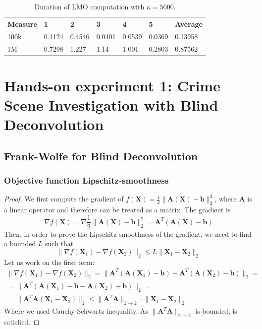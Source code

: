 \documentclass[12pt]{article}
\newcommand{\boldX}{\mathbf{X}}
\newcommand{\boldb}{\mathbf{b}}
\newcommand{\boldA}{\mathbf{A}}
\begin{document}
\begin{table}[ht]
\centering
\caption{Duration of LMO computation with $\kappa = 5000.$}
\label{tab:lmo-durations}
\begin{tabular}{lllllll}
Measure & 1 & 2 & 3 & 4 & 5 & Average \\ \hline
100k & 0.1124 & 0.4546 & 0.0401 & 0.0539 & 0.0369 & 0.13958 \\ \hline
1M & 0.7298 & 1.227 & 1.14 & 1.001 & 0.2803 & 0.87562
\end{tabular}
\end{table}

\section{Hands-on experiment 1: Crime Scene Investigation with Blind Deconvolution}

\subsection{Frank-Wolfe for Blind Deconvolution}
\subsubsection{Objective function Lipschitz-smoothness}
\begin{proof}
We first compute the gradient of $f(\boldX) = \frac{1}{2} \lVert \boldA(\boldX) - \boldb \rVert_{2}^{2}$, where $\boldA$ is a linear operator and therefore can be treated as a matrix. The gradient is
\begin{equation}
    \nabla f(\boldX) = \nabla \frac{1}{2} \lVert \boldA(\boldX) - \boldb \rVert_{2}^{2} = \boldA^T(\boldA(\boldX) - \boldb)
\end{equation}
Then, in order to prove the Lipschitz smoothness of the gradient, we need to find a bounded $L$ such that
\begin{equation} \label{eq:lipschitz}
    \lVert \nabla f(\boldX_1) - \nabla f(\boldX_2) \rVert_{2} \leq L \lVert \boldX_1 - \boldX_2 \rVert_{2}
\end{equation}
Let us work on the first term:
\begin{gather}
    \lVert \nabla f(\boldX_1) - \nabla f(\boldX_2) \rVert_{2} = \lVert \boldA^T(\boldA(\boldX_1) - \boldb) - \boldA^T(\boldA(\boldX_2) - \boldb) \rVert_{2} = \\
    = \lVert \boldA^T(\boldA(\boldX_1) - \boldb - \boldA(\boldX_2) + \boldb) \rVert_{2} = \\
    = \lVert \boldA^T\boldA(\boldX_1 - \boldX_2) \rVert_{2} \leq
    \lVert \boldA^T\boldA \rVert_{2 \rightarrow 2} \cdot \lVert \boldX_1 - \boldX_2 \rVert_{2}
\end{gather}
Where we used Cauchy-Schwartz inequality. As $\lVert \boldA^T\boldA \rVert_{2 \rightarrow 2}$ is bounded,  is satisfied.
\end{proof}
\end{document}
